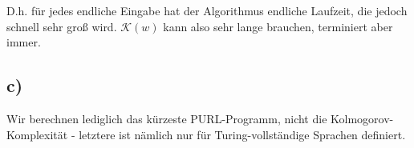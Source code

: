 \documentclass{article}
\begin{document}
D.h. für jedes endliche Eingabe hat der Algorithmus endliche Laufzeit, die jedoch schnell sehr groß wird. $\mathcal{K}(w)$ kann also sehr lange brauchen, terminiert aber immer.

\subsection*{c)}
Wir berechnen lediglich das kürzeste PURL-Programm, nicht die Kolmogorov-Komplexität - letztere ist nämlich nur für Turing-vollständige Sprachen definiert.
\end{document}
